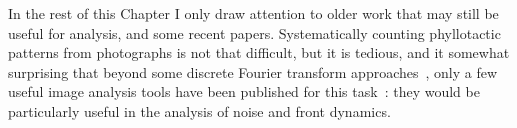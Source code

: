 %  
  In the rest of this Chapter I only draw attention to older work that may still be useful for analysis, and some recent papers. 
  Systematically counting phyllotactic patterns from photographs is not that difficult, but it is tedious, and it somewhat surprising that beyond some  discrete Fourier transform approaches~\cite{negishiDeterminingParastichyPairs2022}, only a few useful image analysis tools  have been published for this task~\cite{aliyevStudyDistributionPhenotypic2024}: they would be particularly useful in the analysis of noise and front dynamics.
  
   
